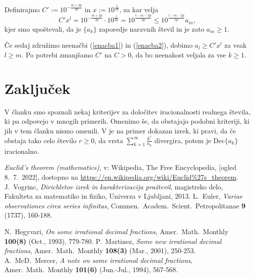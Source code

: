 \documentclass[twoside,11pt]{article}
\begin{document}
Definirajmo $C' := 10^{-\frac{m + 2p}{2p}}$ in $x := 10^{\frac{1}{2p}}$, za kar velja
\begin{equation}\label{enacba2}
     C'x^l = 10^{-\frac{m + 2p}{2p}} \cdot 10^{\frac{l}{2p}} = 10 ^{\frac{l-m-2p}{2p}}
     \leq 10 ^{\frac{l-m-2p}{2p}} a_m,
\end{equation}
kjer smo upoštevali, da je $\{a_k\}$ zaporedje naravnih števil in je zato $a_m \geq 1$.

Če sedaj združimo neenačbi (\ref{enacba1}) in (\ref{enacba2}), dobimo 
$a_l \geq C'x^l$ za vsak $l \geq m$.
Po potrebi zmanjšamo $C'$ na $C>0$, da bo neenakost veljala
za vse $k \geq 1$.
\QED



\section{Zaključek}
V članku smo spoznali nekaj kriterijev za določitev iracionalnosti realnega števila,
ki pa odpovejo v mnogih primerih. 
Omenimo še, da obstajajo podobni kriteriji, ki jih v tem članku nismo omenili. 
V \cite{Mer} je na primer dokazan izrek, ki pravi, da če obstaja tako celo število 
$r \geq 0$, da vrsta
$\sum_{k=1}^{\infty}\frac{k^r}{a_k}$
divergira, potem je $\text{Dec}\{a_k\}$ iracionalno.




\begin{thebibliography}{1}
    \emph{Euclid's theorem (mathematics)}, v: Wikipedia, The Free Encyclopedia, [ogled 8.~7.~2022], 
    dostopno na \url{https://en.wikipedia.org/wiki/Euclid%27s_theorem}.
    J.~Vogrinc, \emph{Dirichletov izrek in karakterizacija praštevil}, 
    magistrsko delo, Fakulteta za matematiko in fiziko, Univerza v Ljubljani, 2013.
    L.~Euler, \emph{Variae observationes circa series infinitas},
    Commen.~Academ.~Scient.~Petropolitanae \textbf{9} (1737), 160-188.

    N.~Hegyvari, \emph{On some irrational decimal fractions},
    Amer.~Math.~Monthly \textbf{100(8)}  (Oct., 1993),  779-780.
    P.~Martinez, \emph{Some new irrational decimal fractions},
    Amer.~Math.~Monthly \textbf{108(3)}  (Mar., 2001),  250-253.
    A.~McD.~Mercer, \emph{A note on some irrational decimal fractions},
    Amer.~Math.~Monthly \textbf{101(6)}  (Jun.-Jul., 1994),  567-568.


    
\end{thebibliography}
\end{document}
